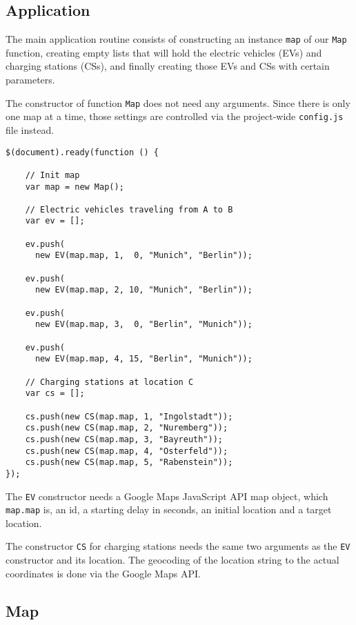 \newpage
\subsection{Application}

The main application routine consists of constructing an instance \texttt{map} of our \texttt{Map} function, creating empty lists that will hold the electric vehicles (EVs) and charging stations (CSs), and finally creating those EVs and CSs with certain parameters.

The constructor of function \texttt{Map} does not need any arguments. Since there is only one map at a time, those settings are controlled via the project-wide \texttt{config.js} file instead.

\begin{verbatim}
$(document).ready(function () {

    // Init map
    var map = new Map();

    // Electric vehicles traveling from A to B
    var ev = [];

    ev.push(
      new EV(map.map, 1,  0, "Munich", "Berlin"));

    ev.push(
      new EV(map.map, 2, 10, "Munich", "Berlin"));

    ev.push(
      new EV(map.map, 3,  0, "Berlin", "Munich"));

    ev.push(
      new EV(map.map, 4, 15, "Berlin", "Munich"));

    // Charging stations at location C
    var cs = [];

    cs.push(new CS(map.map, 1, "Ingolstadt"));
    cs.push(new CS(map.map, 2, "Nuremberg"));
    cs.push(new CS(map.map, 3, "Bayreuth"));
    cs.push(new CS(map.map, 4, "Osterfeld"));
    cs.push(new CS(map.map, 5, "Rabenstein"));
});
\end{verbatim}

The \texttt{EV} constructor needs a Google Maps JavaScript API map object, which \texttt{map.map} is, an id, a starting delay in seconds, an initial location and a target location.

The constructor \texttt{CS} for charging stations needs the same two arguments as the \texttt{EV} constructor and its location. The geocoding of the location string to the actual coordinates is done via the Google Maps API.


\subsection{Map}

